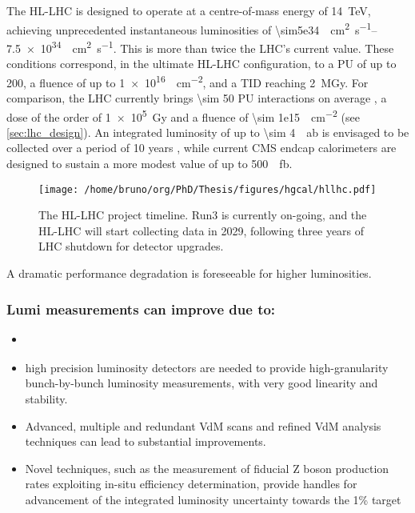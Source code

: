 \documentclass[11pt]{article}
\begin{document}
The \ac{HL-LHC} is designed to operate at a centre-of-mass energy of \SI{14}{\TeV}, achieving unprecedented instantaneous luminosities of \SIrange{\sim5e34}{7.5e34}{\per\cm\squared\per\second}.
This is more than twice the \ac{LHC}’s current value.
These conditions correspond, in the ultimate HL-LHC configuration, to a \ac{PU} of up to 200, a fluence of up to \SI{1e16}{\nequiv\per\cm\squared}, and a \ac{TID} reaching \SI{2}{\mega\gray}.
For comparison, the \ac{LHC} currently brings \num{\sim 50} \ac{PU} interactions on average \cite{pileup_twiki}, a dose of the order of \SI{1e5}{\gray} and a fluence of \SI{\sim 1e15}{\nequiv\per\cm\squared} \cite{lhc_fluences} (see \cref{sec:lhc_design}).
An integrated luminosity of up to \SI{\sim 4}{\per\atto\barn} is envisaged to be collected over a period of 10 years \cite{hllhc}, while current \ac{CMS} endcap calorimeters are designed to sustain a more modest value of up to \SI{500}{\per\femto\barn}.

\begin{figure}[htbp]
\centering
\texttt{[image: /home/bruno/org/PhD/Thesis/figures/hgcal/hllhc.pdf]}
\caption{\label{fig:hllhc}The \ac{HL-LHC} project timeline. Run3 is currently on-going, and the \ac{HL-LHC} will start collecting data in 2029, following three years of \ac{LHC} shutdown for detector upgrades.}
\end{figure}

A dramatic performance degradation is foreseeable for higher luminosities.

\subsubsection{Lumi measurements can improve due to:}
\label{sec:org7265112}
\begin{itemize}
\item \cite{hllhc_physics}
\item high precision luminosity detectors are needed to provide high-granularity bunch-by-bunch luminosity measurements, with very good linearity and stability.
\item Advanced, multiple and redundant VdM scans and refined VdM analysis techniques can lead to substantial improvements.
\item Novel techniques, such as the measurement of fiducial Z boson production rates exploiting in-situ efficiency determination, provide handles for advancement of the integrated luminosity uncertainty towards the 1\% target
\end{itemize}
\end{document}

